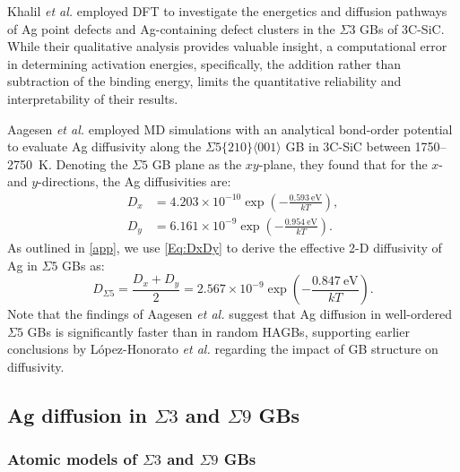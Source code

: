 \documentclass[%
preprint,
amsmath,amssymb,
aps,
]{revtex4-2}
\newcommand{\?}{\stackrel{?}{=}}
\begin{document}
Khalil \textit{et al.} \cite{Khalil2011} employed DFT to investigate the energetics and diffusion pathways of Ag point defects and Ag-containing defect clusters in the $\Sigma 3$ GBs of 3C-SiC. While their qualitative analysis provides valuable insight, a computational error in determining activation energies, specifically, the addition rather than subtraction of the binding energy, limits the quantitative reliability and interpretability of their results.

Aagesen \textit{et al.} \cite{Aagesen2022} employed MD simulations with an analytical bond-order potential to evaluate Ag diffusivity along the $\Sigma 5 \{210\}\langle 001\rangle$ GB in 3C-SiC between 1750--2750~K. Denoting the $\Sigma 5$ GB plane as the $xy$-plane, they found that for the $x$- and $y$-directions, the Ag diffusivities are:
\begin{align}
D_x &= 4.203 \times 10^{-10} \exp\left(-\frac{0.593 \ \text{eV}}{k T} \right), \\
D_y &= 6.161 \times 10^{-9} \exp\left(-\frac{0.954 \ \text{eV}}{k T} \right).
\label{Eq:DxDy}
\end{align}
As outlined in \ref{app}, we use \cref{Eq:DxDy} to derive the effective 2-D diffusivity of Ag in $\Sigma 5$ GBs as:
\begin{equation}
D_{\Sigma 5} = \frac{D_x + D_y}{2} = 2.567 \times 10^{-9} \exp\left(-\frac{0.847 \ \text{eV}}{k T} \right).
\label{Eq:Sigma5}
\end{equation}
Note that the findings of Aagesen \textit{et al.} suggest that Ag diffusion in well-ordered $\Sigma 5$ GBs is significantly faster than in random HAGBs, supporting earlier conclusions by López-Honorato \textit{et al.} regarding the impact of GB structure on diffusivity.


\subsection{Ag diffusion in $\Sigma 3$ and $\Sigma 9$ GBs}

\subsubsection{Atomic models of $\Sigma 3$ and $\Sigma 9$ GBs}
\end{document}
